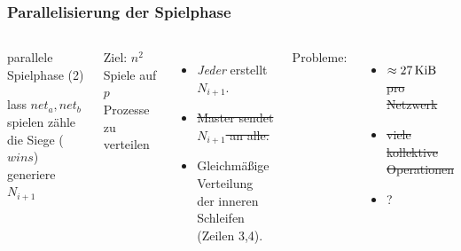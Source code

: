\begin{frame}[t]
    \frametitle{Parallelisierung der Spielphase}

    \begin{columns}[t]
        \vspace{-0.7cm}
        \begin{algorithm}[H]
            \caption{parallele Spielphase (2)}
            \begin{algorithmic}[1]
                            \State lass $net_a, net_b$ spielen
                            \State zähle die Siege ($wins$)
                        \EndParDo
                    \EndParDo
                    \State {}
                    \State generiere $N_{i+1}$
                \EndFor
            \end{algorithmic}
        \end{algorithm}
        \hfill

        Ziel: $n^2$ Spiele auf $p$ Prozesse zu verteilen
        \begin{itemize}
            \item \emph{Jeder} erstellt $N_{i+1}$.
            \item \sout{Master sendet $N_{i+1}$ an alle.}
            \item Gleichmäßige Verteilung der inneren Schleifen (Zeilen 3,4).
        \end{itemize}
        Probleme:
        \begin{itemize}
            \item \sout{$\approx \SI{27}{\kibi\byte}$ pro Netzwerk}
            \item \sout{viele kollektive Operationen}
            \item ?
        \end{itemize}
    \end{columns}
\end{frame}

